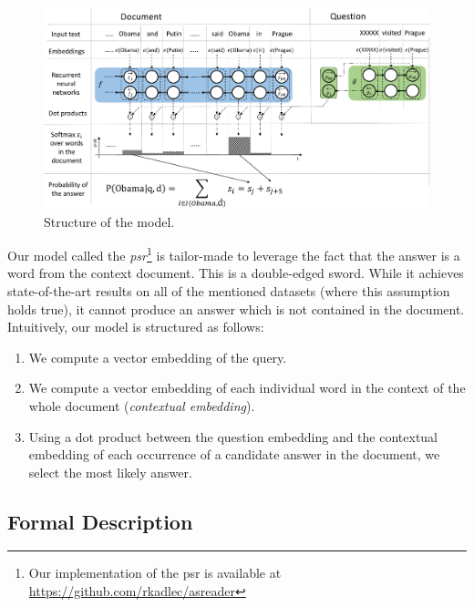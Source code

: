 \documentclass[11pt]{article}
\newcommand{\MARTIN}[1]{{\color{black}#1}}
\newcommand{\RUDAA}[1]{{\color{black}#1}}
\begin{document}
\begin{figure}[ht]
  \centering
  \includegraphics[width=5in]{model-structure_v2_cropped.pdf}
  \caption   
  {
  Structure of the model.
  }
  \label{fig:model-structure}
\end{figure}



\MARTIN
{


Our model called the \emph{\gls{psr}}\footnote{\RUDAA{Our implementation of the \gls{psr} is available at \url{https://github.com/rkadlec/asreader}}} is tailor-made to leverage the fact that the answer is a word from the context document.
This is a double-edged sword.
While it achieves state-of-the-art results on all of the mentioned datasets (where this assumption holds true), it cannot produce an answer which is not contained in the document.
Intuitively, our model is structured as follows:
\begin{enumerate}
\item We compute a vector embedding of the query.
\item We compute a vector embedding of each individual word in the context of the whole document (\emph{contextual embedding}).
\item Using a dot product between the question embedding 
and the contextual embedding of each occurrence of a candidate answer in the document, we select the most likely answer.
\end{enumerate}
}



\subsection{Formal Description}
\end{document}
